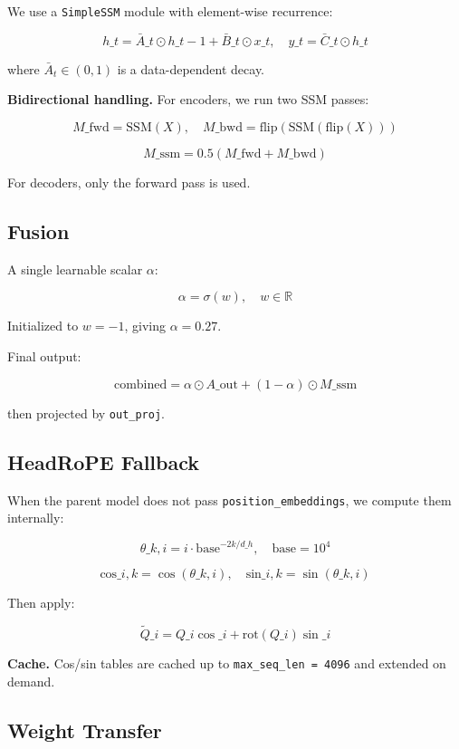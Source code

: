 We use a \texttt{SimpleSSM} module with element-wise recurrence:

\[
h\_t = \bar{A}\_t \odot h\_{t-1} + \bar{B}\_t \odot x\_t, \quad
y\_t = \bar{C}\_t \odot h\_t
\tag{4.7}
\]

where $\bar{A}_t \in (0, 1)$ is a data-dependent decay.

\textbf{Bidirectional handling.} For encoders, we run two SSM passes:

\[
M\_\text{fwd} = \text{SSM}(X), \quad
M\_\text{bwd} = \text{flip}(\text{SSM}(\text{flip}(X)))
\tag{4.8}
\]

\[
M\_\text{ssm} = 0.5 (M\_\text{fwd} + M\_\text{bwd})
\tag{4.9}
\]

For decoders, only the forward pass is used.

\subsection{Fusion}

A single learnable scalar $\alpha$:

\[
\alpha = \sigma(w), \quad w \in \mathbb{R}
\tag{4.10}
\]

Initialized to $w = -1$, giving $\alpha = 0.27$.

Final output:

\[
\text{combined} = \alpha \odot A\_\text{out} + (1 - \alpha) \odot M\_\text{ssm}
\tag{4.11}
\]

then projected by \texttt{out\_proj}.

\subsection{HeadRoPE Fallback}

When the parent model does not pass \texttt{position\_embeddings}, we compute them 
internally:

\[
\theta\_{k, i} = i \cdot \text{base}^{-2k/d\_h}, \quad \text{base} = 10^4
\tag{4.12}
\]

\[
\text{cos}\_{i, k} = \cos(\theta\_{k, i}), \quad \text{sin}\_{i, k} = \sin(\theta\_{k, i})
\tag{4.13}
\]

Then apply:

\[
\tilde{Q}\_i = Q\_i \cos\_i + \text{rot}(Q\_i) \sin\_i
\tag{4.14}
\]

\textbf{Cache.} Cos/sin tables are cached up to \texttt{max\_seq\_len = 4096} and extended 
on demand.

\subsection{Weight Transfer}

